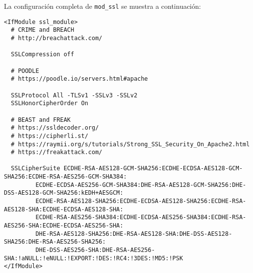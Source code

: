La configuraci\'{o}n completa de \texttt{mod\_ssl} se muestra a continuaci\'{o}n:

{
\scriptsize
\linespread{1}
\begin{verbatim}
<IfModule ssl_module>
  # CRIME and BREACH
  # http://breachattack.com/

  SSLCompression off

  # POODLE
  # https://poodle.io/servers.html#apache

  SSLProtocol All -TLSv1 -SSLv3 -SSLv2
  SSLHonorCipherOrder On

  # BEAST and FREAK
  # https://ssldecoder.org/
  # https://cipherli.st/
  # https://raymii.org/s/tutorials/Strong_SSL_Security_On_Apache2.html
  # https://freakattack.com/

  SSLCipherSuite ECDHE-RSA-AES128-GCM-SHA256:ECDHE-ECDSA-AES128-GCM-SHA256:ECDHE-RSA-AES256-GCM-SHA384:
         ECDHE-ECDSA-AES256-GCM-SHA384:DHE-RSA-AES128-GCM-SHA256:DHE-DSS-AES128-GCM-SHA256:kEDH+AESGCM:
         ECDHE-RSA-AES128-SHA256:ECDHE-ECDSA-AES128-SHA256:ECDHE-RSA-AES128-SHA:ECDHE-ECDSA-AES128-SHA:
         ECDHE-RSA-AES256-SHA384:ECDHE-ECDSA-AES256-SHA384:ECDHE-RSA-AES256-SHA:ECDHE-ECDSA-AES256-SHA:
         DHE-RSA-AES128-SHA256:DHE-RSA-AES128-SHA:DHE-DSS-AES128-SHA256:DHE-RSA-AES256-SHA256:
         DHE-DSS-AES256-SHA:DHE-RSA-AES256-SHA:!aNULL:!eNULL:!EXPORT:!DES:!RC4:!3DES:!MD5:!PSK
</IfModule>

\end{verbatim}
}

